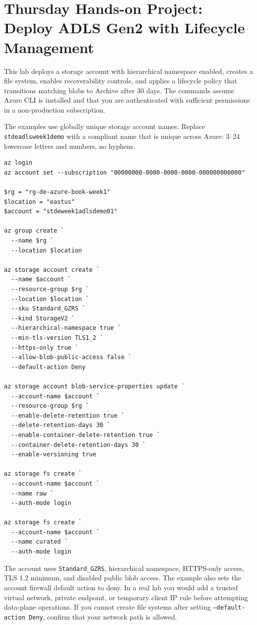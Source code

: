 \section{Thursday Hands-on Project: Deploy ADLS Gen2 with Lifecycle Management}
This lab deploys a storage account with hierarchical namespace enabled, creates a file system, enables recoverability controls, and applies a lifecycle policy that transitions matching blobs to Archive after 30 days. The commands assume Azure CLI is installed and that you are authenticated with sufficient permissions in a non-production subscription.

\begin{notebox}
The examples use globally unique storage account names. Replace \texttt{stdeadlsweek1demo} with a compliant name that is unique across Azure: 3--24 lowercase letters and numbers, no hyphens.
\end{notebox}

\begin{lstlisting}[language=AzureCLI,caption={Deploying an ADLS Gen2 account and basic lake file systems with Azure CLI.},label={lst:adls-cli}]
az login
az account set --subscription "00000000-0000-0000-0000-000000000000"

$rg = "rg-de-azure-book-week1"
$location = "eastus"
$account = "stdeweek1adlsdemo01"

az group create `
  --name $rg `
  --location $location

az storage account create `
  --name $account `
  --resource-group $rg `
  --location $location `
  --sku Standard_GZRS `
  --kind StorageV2 `
  --hierarchical-namespace true `
  --min-tls-version TLS1_2 `
  --https-only true `
  --allow-blob-public-access false `
  --default-action Deny

az storage account blob-service-properties update `
  --account-name $account `
  --resource-group $rg `
  --enable-delete-retention true `
  --delete-retention-days 30 `
  --enable-container-delete-retention true `
  --container-delete-retention-days 30 `
  --enable-versioning true

az storage fs create `
  --account-name $account `
  --name raw `
  --auth-mode login

az storage fs create `
  --account-name $account `
  --name curated `
  --auth-mode login
\end{lstlisting}

The account uses \texttt{Standard\_GZRS}, hierarchical namespace, HTTPS-only access, TLS 1.2 minimum, and disabled public blob access. The example also sets the account firewall default action to deny. In a real lab you would add a trusted virtual network, private endpoint, or temporary client IP rule before attempting data-plane operations. If you cannot create file systems after setting \texttt{--default-action Deny}, confirm that your network path is allowed.

